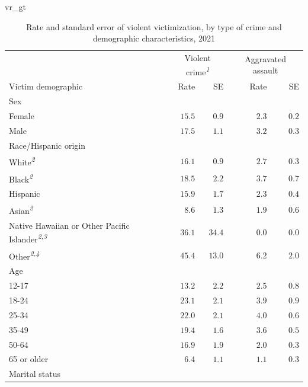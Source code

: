 \documentclass[
]{krantz}
\makeatletter
\newenvironment{Shaded}{\begin{snugshade}}{\end{snugshade}}
\newcommand{\NormalTok}[1]{#1}
\newenvironment{kframe}{%
\medskip{}
\setlength{\fboxsep}{.8em}
 \def\at@end@of@kframe{}%
 \ifinner\ifhmode%
  \def\at@end@of@kframe{\end{minipage}}%
  \begin{minipage}{\columnwidth}%
 \fi\fi%
 \def\FrameCommand##1{\hskip\@totalleftmargin \hskip-\fboxsep
 \colorbox{shadecolor}{##1}\hskip-\fboxsep
     \hskip-\linewidth \hskip-\@totalleftmargin \hskip\columnwidth}%
 \MakeFramed {\advance\hsize-\width
   \@totalleftmargin\z@ \linewidth\hsize
   \@setminipage}}%
 {\par\unskip\endMakeFramed%
 \at@end@of@kframe}
\renewenvironment{Shaded}{\begin{kframe}}{\end{kframe}}
\makeatother
\begin{document}
\begin{Shaded}
\begin{Highlighting}[]
\NormalTok{vr\_gt}
\end{Highlighting}
\end{Shaded}



\setlength{\LTpost}{0mm}
\begin{longtable}{l|rrrr}
\caption{\label{tab:ncvs-vign-rates-demo-tab}Rate and standard error of violent victimization, by type of crime and demographic characteristics, 2021}\\
\toprule
\multicolumn{1}{l}{} & \multicolumn{2}{c}{Violent crime\textsuperscript{\textit{1}}} & \multicolumn{2}{c}{Aggravated assault} \\ 
\cmidrule(lr){2-3} \cmidrule(lr){4-5}
\multicolumn{1}{l}{Victim demographic} & Rate & SE & Rate & SE \\ 
\midrule
\multicolumn{5}{l}{Sex} \\ 
\midrule
Female & $15.5$ & $0.9$ & $2.3$ & $0.2$ \\ 
Male & $17.5$ & $1.1$ & $3.2$ & $0.3$ \\ 
\midrule
\multicolumn{5}{l}{Race/Hispanic origin} \\ 
\midrule
White\textsuperscript{\textit{2}} & $16.1$ & $0.9$ & $2.7$ & $0.3$ \\ 
Black\textsuperscript{\textit{2}} & $18.5$ & $2.2$ & $3.7$ & $0.7$ \\ 
Hispanic & $15.9$ & $1.7$ & $2.3$ & $0.4$ \\ 
Asian\textsuperscript{\textit{2}} & $8.6$ & $1.3$ & $1.9$ & $0.6$ \\ 
Native Hawaiian or Other Pacific Islander\textsuperscript{\textit{2,3}} & $36.1$ & $34.4$ & $0.0$ & $0.0$ \\ 
Other\textsuperscript{\textit{2,4}} & $45.4$ & $13.0$ & $6.2$ & $2.0$ \\ 
\midrule
\multicolumn{5}{l}{Age} \\ 
\midrule
12-17 & $13.2$ & $2.2$ & $2.5$ & $0.8$ \\ 
18-24 & $23.1$ & $2.1$ & $3.9$ & $0.9$ \\ 
25-34 & $22.0$ & $2.1$ & $4.0$ & $0.6$ \\ 
35-49 & $19.4$ & $1.6$ & $3.6$ & $0.5$ \\ 
50-64 & $16.9$ & $1.9$ & $2.0$ & $0.3$ \\ 
65 or older & $6.4$ & $1.1$ & $1.1$ & $0.3$ \\ 
\midrule
\multicolumn{5}{l}{Marital status} \\ 

\end{longtable}
\end{document}
